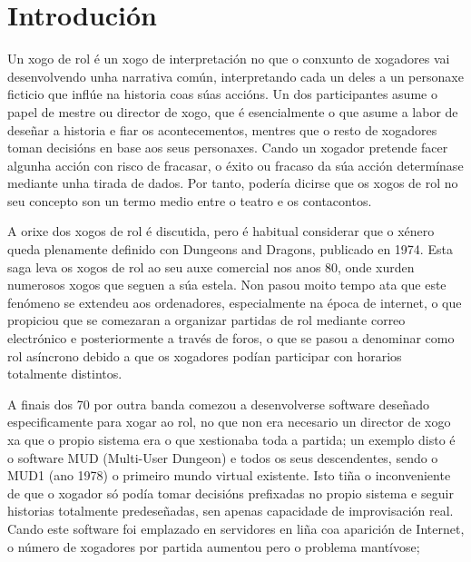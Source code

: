 \chapter{Introdución}

Un xogo de rol é un xogo de interpretación no que o conxunto de xogadores vai
desenvolvendo unha narrativa común, interpretando cada un deles a un personaxe
ficticio que inflúe na historia coas súas accións. Un dos participantes asume o
papel de mestre ou director de xogo, que é esencialmente o que asume a labor de
deseñar a historia e fiar os acontecementos, mentres que o resto de xogadores
toman decisións en base aos seus personaxes. Cando un xogador pretende facer
algunha acción con risco de fracasar, o éxito ou fracaso da súa acción
determínase mediante unha tirada de dados. Por tanto, podería dicirse que os
xogos de rol no seu concepto son un termo medio entre o teatro e os contacontos.
\par
A orixe dos xogos de rol é discutida, pero é habitual considerar que o xénero
queda plenamente definido con Dungeons and Dragons, publicado en 1974. Esta saga
leva os xogos de rol ao seu auxe comercial nos anos 80, onde xurden numerosos
xogos que seguen a súa estela. Non pasou moito tempo ata que este fenómeno se
extendeu aos ordenadores, especialmente na época de internet, o que propiciou
que se comezaran a organizar partidas de rol mediante correo electrónico e
posteriormente a través de foros, o que se pasou a denominar como rol asíncrono
debido a que os xogadores podían participar con horarios totalmente distintos.
\par
A finais dos 70 por outra banda comezou a desenvolverse software deseñado
especificamente para xogar ao rol, no que non era necesario un director de xogo
xa que o propio sistema era o que xestionaba toda a partida; un exemplo disto é
o software MUD (Multi-User Dungeon) e todos os seus descendentes, sendo o MUD1
(ano 1978) o primeiro mundo virtual existente. Isto tiña o inconveniente de que
o xogador só podía tomar decisións prefixadas no propio sistema e seguir
historias totalmente predeseñadas, sen apenas capacidade de improvisación real.
Cando este software foi emplazado en servidores en liña coa aparición de
Internet, o número de xogadores por partida aumentou pero o problema mantívose;
